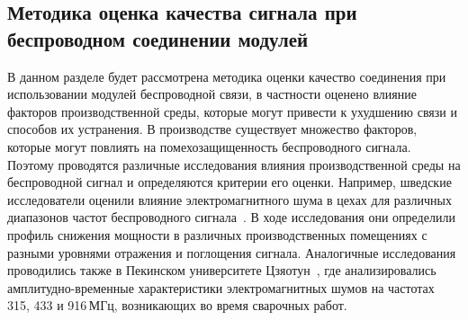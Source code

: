 %
%
%
%
%

\subsection{Методика оценка качества сигнала при беспроводном соединении модулей}

В данном разделе будет рассмотрена методика оценки качество соединения при использовании модулей беспроводной связи, в частности оценено влияние факторов производственной среды, которые могут привести к ухудшению связи и способов их устранения. В производстве существует множество факторов, которые могут повлиять на помехозащищенность беспроводного сигнала. Поэтому проводятся различные исследования влияния производственной среды на беспроводной сигнал и определяются критерии его оценки. Например, шведские исследователи оценили влияние электромагнитного шума в цехах для различных диапазонов частот беспроводного сигнала~\cite{6525614, 5475862}. В ходе исследования они определили профиль снижения мощности в различных производственных помещениях с разными уровнями отражения и поглощения сигнала. Аналогичные исследования проводились также в Пекинском университете Цзяотун~\cite{Li2019}, где анализировались амплитудно-временные характеристики электромагнитных шумов на частотах 315, 433 и 916\,МГц, возникающих во время сварочных работ.
	
